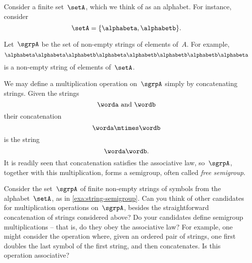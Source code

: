 \begin{example}
  \label{string-sgrp}
  \label{exa:string-semigroup}
  Consider a finite set~$\setA$, which we think of as an alphabet. For instance, consider
  \begin{equation}
    \label{eq:string-semigroup-alphabet}
    \setA = \{ \alphabeta, \alphabetb \}.
  \end{equation}

  Let~$\sgrpA$ be the set of non-empty strings of elements of~$A$. For example,
  \begin{equation}
    \label{eq:string-semigroup-word}
    \alphabeta\alphabeta \alphabetb \alphabeta \alphabetb \alphabetb \alphabetb \alphabeta
  \end{equation}
  is a non-empty string of elements of~$\setA$.

  We may define a multiplication operation on~$\sgrpA$ simply by concatenating strings. Given the strings
  \begin{equation*}
    \worda \text{ and } \wordb
  \end{equation*}
  their concatenation
  \begin{equation*}
    \label{eq:string-semigroup-wordab}
    \worda \mtimes  \wordb
  \end{equation*}
  is the string
  \begin{equation*}
    \label{eq:string-semigroup-wordab-concat}
    \worda \wordb.
  \end{equation*}
  It is readily seen that concatenation satisfies the associative law, so~$\sgrpA$, together with this multiplication, forms a semigroup, often called \emph{free semigroup}.
\end{example}
\devel{
  \begin{forslides}
    \begin{equation}
      \label{eq:string-semigroup-empty-string}
      \alphabeta\alphabeta \alphabetb \mtimes \tup{} =  \alphabeta\alphabeta \alphabetb
    \end{equation}
  \end{forslides}
}


\begin{gradedexercise}
  \label{ex:alphabet}
  Consider the set~$\sgrpA$ of finite non-empty strings of symbols from the alphabet~$\setA$, as in \cref{exa:string-semigroup}.
  Can you think of other candidates for multiplication operations on~$\sgrpA$, besides the straightforward concatenation of strings considered above?
  Do your candidates define semigroup multiplications -- that is, do they obey the associative law?
  For example, one might consider the operation where, given an ordered pair of strings, one first doubles the last symbol of the first string, and then concatenates.
  Is this operation associative?
\end{gradedexercise}


